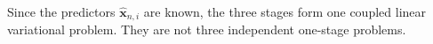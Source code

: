 \documentclass[11pt,a4paper]{article}
\newcommand{\bs}{\boldsymbol}
\newcommand{\dt}{\Delta t}
\newcommand{\V}{\mathbb V}
\newcommand{\Aform}{\mathtt A}
\newcommand{\ff}{\mathtt f}
\newcommand{\dual}[2]{\left\langle#1,#2\right\rangle}
\newtheorem{corollary}[corollary]{Corollary}
\theoremstyle{definition}
\numberwithin{equation}{section}
\begin{document}
Since the predictors \(\widehat{\bs x}_{n,i}\) are known, the three
stages form one coupled linear variational problem. They are not three
independent one-stage problems.
%
%
%
\end{document}
